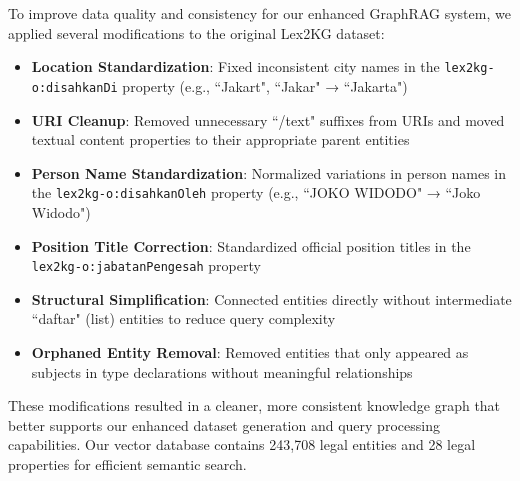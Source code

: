 To improve data quality and consistency for our enhanced GraphRAG system, we applied several modifications to the original Lex2KG dataset:

\begin{itemize}
    \item \textbf{Location Standardization}: Fixed inconsistent city names in the \texttt{lex2kg-o:disahkanDi} property (e.g., ``Jakart", ``Jakar" → ``Jakarta")
    \item \textbf{URI Cleanup}: Removed unnecessary ``/text" suffixes from URIs and moved textual content properties to their appropriate parent entities
    \item \textbf{Person Name Standardization}: Normalized variations in person names in the \texttt{lex2kg-o:disahkanOleh} property (e.g., ``JOKO WIDODO" → ``Joko Widodo")
    \item \textbf{Position Title Correction}: Standardized official position titles in the \texttt{lex2kg-o:jabatanPengesah} property
    \item \textbf{Structural Simplification}: Connected entities directly without intermediate ``daftar" (list) entities to reduce query complexity
    \item \textbf{Orphaned Entity Removal}: Removed entities that only appeared as subjects in type declarations without meaningful relationships
\end{itemize}

These modifications resulted in a cleaner, more consistent knowledge graph that better supports our enhanced dataset generation and query processing capabilities. Our vector database contains 243,708 legal entities and 28 legal properties for efficient semantic search.

